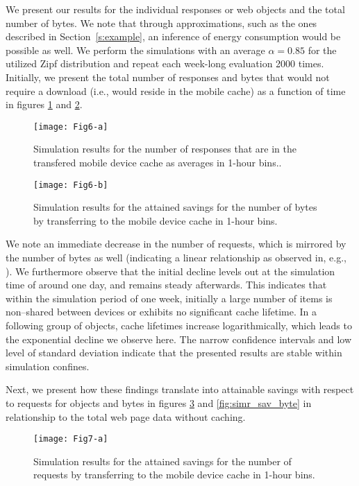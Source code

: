 We present our results for the individual responses or web objects and the total number of bytes.
We note that through approximations, such as the ones described in Section~\ref{s:example}, an inference of energy consumption would be possible as well.
We perform the simulations with an average $\alpha=0.85$ for the utilized Zipf distribution and repeat each week-long evaluation 2000 times.
Initially, we present the total number of responses and bytes that would not require a download (i.e., would reside in the mobile cache) as a function of time in figures \ref{fig:simr_abs_reqs} and \ref{fig:simr_abs_byte}.

\begin{figure}
	\centering
	\texttt{[image: Fig6-a]}
	\caption{Simulation results for the number of responses that are in the transfered mobile device cache as averages in 1-hour bins..}
	 \label{fig:simr_abs_reqs}
\end{figure}

\begin{figure}
	\centering
	\texttt{[image: Fig6-b]}
	\caption{Simulation results for the attained savings for the number of bytes by transferring to the mobile device cache in 1-hour bins.}
	 \label{fig:simr_abs_byte}
\end{figure}

We note an immediate decrease in the number of requests, which is mirrored by the number of bytes as well (indicating a linear relationship as observed in, e.g., \cite{JoSe14Commag}).
We furthermore observe that the initial decline levels out at the simulation time of around one day, and  remains steady afterwards.
This indicates that within the simulation period of one week, initially a large number of items is non--shared between devices or exhibits no significant cache lifetime. 
In a following group of objects, cache lifetimes increase logarithmically, which leads to the exponential decline we observe here.
The narrow confidence intervals and low level of standard deviation indicate that the presented results are stable within simulation confines.

Next, we present how these findings translate into attainable savings with respect to requests for objects and bytes in figures \ref{fig:simr_sav_reqs} and \ref{fig:simr_sav_byte} in relationship to the total web page data without caching.

\begin{figure}
	\centering
	\texttt{[image: Fig7-a]}
	\caption{Simulation results for the attained savings for the number of requests by transferring to the mobile device cache in 1-hour bins.}
	 \label{fig:simr_sav_reqs}
\end{figure}

